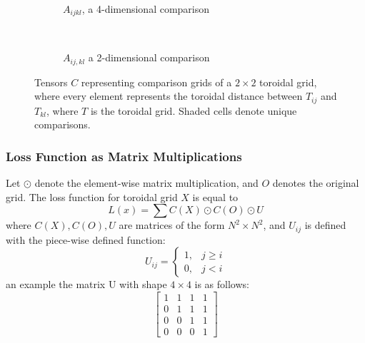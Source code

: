 \begin{figure}[htpb]
    \centering
    \begin{subfigure}[t]{0.5\textwidth}
    \begin{center}
    \end{center}
    \caption{$A_{ijkl}$, a 4-dimensional comparison}
    \label{fig:4dcomparison}
    \end{subfigure}%
    ~
    \begin{subfigure}[t]{0.5\textwidth}
    \begin{center}
    \end{center}
    \caption{$A_{ij,kl}$ a 2-dimensional comparison}
    \label{fig:2dcomparison}
    \end{subfigure}

    \caption{Tensors $C$ representing comparison grids of a $2\times 2$ toroidal grid, where every element represents the toroidal distance between $T_{ij}$ and $T_{kl}$, where $T$ is the toroidal grid. Shaded cells denote unique comparisons.}%
    \label{fig:comparisonGrids}
\end{figure}

\subsubsection{Loss Function as Matrix Multiplications}%
\label{ssub:loss_function_as_matrix_multiplications}
Let $\odot$ denote the element-wise matrix multiplication, and $O$ denotes the original grid. The loss function for toroidal grid $X$ is equal to
\begin{equation}
    L(x)=\sum C(X)\odot C(O)\odot U
\end{equation}
where $C(X),C(O),U$ are matrices of the form $N^2\times N^2$, and $U_{ij}$ is defined with the piece-wise defined function:
\begin{equation}
    U_{ij}=
    \begin{cases}
        1, & j\geq i \\
        0, & j<i
    \end{cases}
\end{equation}
an example the matrix U with shape $4\times 4$ is as follows:
 \begin{equation}
    \begin{bmatrix}
        1&1&1&1\\
        0&1&1&1\\
        0&0&1&1\\
        0&0&0&1
    \end{bmatrix}
\end{equation}
